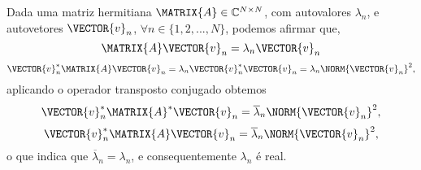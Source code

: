 \begin{myproofT}\label{proof:theo:autovalorhermitianmatrix0}
Dada uma matriz hermitiana $\MATRIX{A} \in \mathbb{C}^{N \times N}$, com  autovalores $\lambda_n$,
e autovetores $\VECTOR{v}_n$, $\forall n \in \{1, 2, ..., N\}$, podemos afirmar que,
\begin{equation}
\MATRIX{A}\VECTOR{v}_n=\lambda_n \VECTOR{v}_n
\end{equation}
\begin{equation}
\VECTOR{v}_n^{\ast}\MATRIX{A}\VECTOR{v}_n=\lambda_n \VECTOR{v}_n^{\ast} \VECTOR{v}_n=\lambda_n \NORM{\VECTOR{v}_n}^2,
\end{equation}
aplicando o operador transposto conjugado obtemos
\begin{equation}
\VECTOR{v}_n^{\ast}\MATRIX{A}^{\ast}\VECTOR{v}_n=\overline{\lambda}_n \NORM{\VECTOR{v}_n}^2,
\end{equation}
\begin{equation}
\VECTOR{v}_n^{\ast}\MATRIX{A}\VECTOR{v}_n=\overline{\lambda}_n \NORM{\VECTOR{v}_n}^2,
\end{equation}
o que indica que $\overline{\lambda}_n=\lambda_n$, e consequentemente $\lambda_n$ é real.
\end{myproofT}

